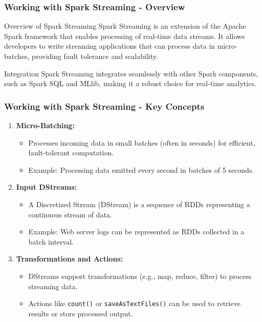 \documentclass[aspectratio=169]{beamer}
\begin{document}
\begin{frame}[fragile]
    \frametitle{Working with Spark Streaming - Overview}
    \begin{block}{Overview of Spark Streaming}
        Spark Streaming is an extension of the Apache Spark framework that enables processing of real-time data streams. It allows developers to write streaming applications that can process data in micro-batches, providing fault tolerance and scalability.
    \end{block}
    \begin{block}{Integration}
        Spark Streaming integrates seamlessly with other Spark components, such as Spark SQL and MLlib, making it a robust choice for real-time analytics.
    \end{block}
\end{frame}

\begin{frame}[fragile]
    \frametitle{Working with Spark Streaming - Key Concepts}
    \begin{enumerate}
        \item \textbf{Micro-Batching:}
            \begin{itemize}
                \item Processes incoming data in small batches (often in seconds) for efficient, fault-tolerant computation.
                \item Example: Processing data emitted every second in batches of 5 seconds.
            \end{itemize}
        
        \item \textbf{Input DStreams:}
            \begin{itemize}
                \item A Discretized Stream (DStream) is a sequence of RDDs representing a continuous stream of data.
                \item Example: Web server logs can be represented as RDDs collected in a batch interval.
            \end{itemize}
        
        \item \textbf{Transformations and Actions:}
            \begin{itemize}
                \item DStreams support transformations (e.g., map, reduce, filter) to process streaming data.
                \item Actions like \texttt{count()} or \texttt{saveAsTextFiles()} can be used to retrieve results or store processed output.
            \end{itemize}
    \end{enumerate}
\end{frame}
\end{document}
